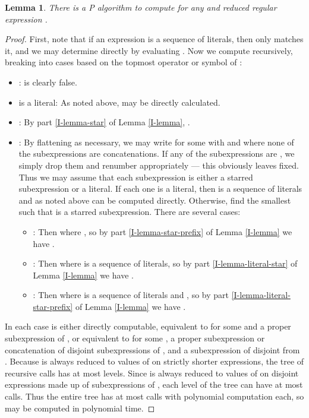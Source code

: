 \documentclass[11pt]{amsart}
\newtheorem{lemma}{Lemma}
\theoremstyle{definition}
\theoremstyle{remark}
\begin{document}
\begin{lemma} \label{I-algorithm}
There is a \textsf{P} algorithm to compute  for any  and reduced regular expression .
\end{lemma}
\begin{proof}
First, note that if an expression  is a sequence of literals, then only  matches it, and we may determine  directly by evaluating . Now we compute  recursively, breaking into cases based on the topmost operator or symbol of :
\begin{itemize}
\item :  is clearly false.
\item  is a literal: As noted above,  may be directly calculated.
\item : By part \ref{I-lemma-star} of Lemma \ref{I-lemma}, .
\item : By flattening as necessary, we may write  for some  with  and where none of the subexpressions  are concatenations. If any of the subexpressions  are , we simply drop them and renumber appropriately --- this obviously leaves  fixed. Thus we may assume that each subexpression  is either a starred subexpression or a literal. If each one is a literal, then  is a sequence of literals and as noted above  can be computed directly. Otherwise, find the smallest  such that  is a starred subexpression. There are several cases:
\begin{itemize}
\item : Then  where , so by part \ref{I-lemma-star-prefix} of Lemma \ref{I-lemma} we have .
\item : Then  where  is a sequence of literals, so by part \ref{I-lemma-literal-star} of Lemma \ref{I-lemma} we have .
\item : Then  where  is a sequence of literals and , so by part \ref{I-lemma-literal-star-prefix} of Lemma \ref{I-lemma} we have .
\end{itemize}
\end{itemize}

In each case  is either directly computable, equivalent to  for some  and  a proper subexpression of , or equivalent to  for some ,  a proper subexpression or concatenation of disjoint subexpressions of , and  a subexpression of  disjoint from . Because  is always reduced to values of  on strictly shorter expressions, the tree of recursive calls has at most  levels. Since  is always reduced to values of  on disjoint expressions made up of subexpressions of , each level of the tree can have at most  calls. Thus the entire tree has at most  calls with polynomial computation each, so  may be computed in polynomial time.
\end{proof}
\end{document}
